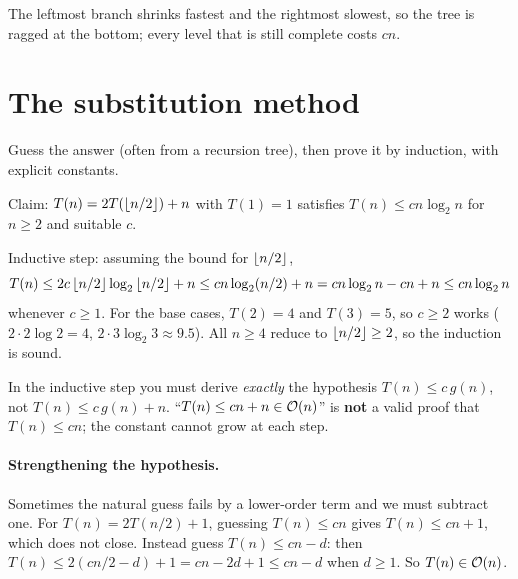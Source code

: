 \begin{center}
\end{center}
The leftmost branch shrinks fastest and the rightmost slowest, so the tree
is ragged at the bottom; every level that is still complete costs $cn$.

\section{The substitution method}
Guess the answer (often from a recursion tree), then prove it by induction, with explicit constants.

\begin{example}
Claim: $T(n)=2T(\left\lfloor n/2 \right\rfloor)+n$ with $T(1)=1$ satisfies $T(n)\le cn\log_2 n$ for $n\ge 2$ and suitable $c$.

Inductive step: assuming the bound for $\left\lfloor n/2 \right\rfloor$,
\[
T(n)\le 2c\left\lfloor n/2 \right\rfloor\log_2\left\lfloor n/2 \right\rfloor+n\le cn\log_2(n/2)+n=cn\log_2 n-cn+n\le cn\log_2 n
\]
whenever $c\ge1$. For the base cases, $T(2)=4$ and $T(3)=5$, so $c\ge2$ works ($2\cdot 2\log 2=4$, $2\cdot 3\log_2 3\approx 9.5$).
All $n\ge4$ reduce to $\left\lfloor n/2 \right\rfloor\ge2$, so the induction is sound.
\end{example}

\begin{important}
In the inductive step you must derive \emph{exactly} the hypothesis $T(n)\le c\,g(n)$, not $T(n)\le c\,g(n)+n$.
``$T(n)\le cn+n\in\mathcal{O}(n)$'' is \textbf{not} a valid proof that $T(n)\le cn$; the constant cannot grow at each step.
\end{important}

\paragraph{Strengthening the hypothesis.}
Sometimes the natural guess fails by a lower-order term and we must subtract one.
For $T(n)=2T(n/2)+1$, guessing $T(n)\le cn$ gives $T(n)\le cn+1$, which does not close.
Instead guess $T(n)\le cn-d$: then $T(n)\le 2(cn/2-d)+1=cn-2d+1\le cn-d$ when $d\ge1$. So $T(n)\in\mathcal{O}(n)$.

